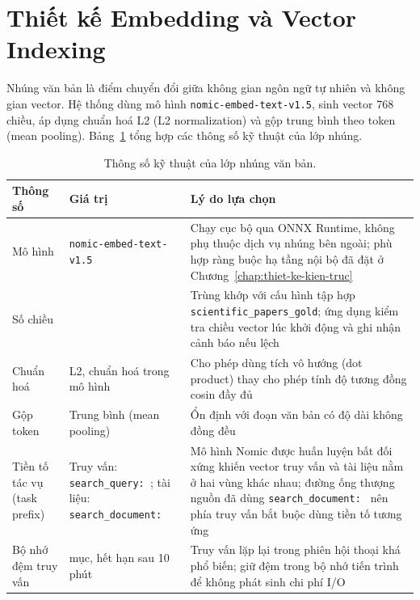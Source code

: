 \section{Thiết kế Embedding và Vector Indexing}
\label{sec:embedding-vector-indexing}

Nhúng văn bản là điểm chuyển đổi giữa không gian ngôn ngữ tự nhiên và không gian vector. Hệ thống dùng mô hình \texttt{nomic-embed-text-v1.5}, sinh vector 768 chiều, áp dụng chuẩn hoá L2 (L2 normalization) và gộp trung bình theo token (mean pooling). Bảng~\ref{tab:thong-so-embedding} tổng hợp các thông số kỹ thuật của lớp nhúng.

\begin{table}[htbp]
    \centering
    \caption{Thông số kỹ thuật của lớp nhúng văn bản.}
    \label{tab:thong-so-embedding}
    \small
    \begin{tabularx}{\textwidth}{@{}>{\raggedright\arraybackslash}p{3.2cm}>{\raggedright\arraybackslash}p{4.45cm}>{\raggedright\arraybackslash}X@{}}
        \toprule
        \textbf{Thông số} & \textbf{Giá trị} & \textbf{Lý do lựa chọn} \\
        \midrule
        Mô hình & \texttt{nomic-embed-text-v1.5} & Chạy cục bộ qua ONNX Runtime, không phụ thuộc dịch vụ nhúng bên ngoài; phù hợp ràng buộc hạ tầng nội bộ đã đặt ở Chương~\ref{chap:thiet-ke-kien-truc} \\
        Số chiều & 768 & Trùng khớp với cấu hình tập hợp \texttt{scientific\_papers\_gold}; ứng dụng kiểm tra chiều vector lúc khởi động và ghi nhận cảnh báo nếu lệch \\
        Chuẩn hoá & L2, chuẩn hoá trong mô hình & Cho phép dùng tích vô hướng (dot product) thay cho phép tính độ tương đồng cosin đầy đủ \\
        Gộp token & Trung bình (mean pooling) & Ổn định với đoạn văn bản có độ dài không đồng đều \\
        Tiền tố tác vụ (task prefix) & Truy vấn: \texttt{search\_query: }; tài liệu: \texttt{search\_document: } & Mô hình Nomic được huấn luyện bất đối xứng khiến vector truy vấn và tài liệu nằm ở hai vùng khác nhau; đường ống thượng nguồn đã dùng \texttt{search\_document: } nên phía truy vấn bắt buộc dùng tiền tố tương ứng \\
        Bộ nhớ đệm truy vấn & 500 mục, hết hạn sau 10 phút & Truy vấn lặp lại trong phiên hội thoại khá phổ biến; giữ đệm trong bộ nhớ tiến trình để không phát sinh chi phí I/O \\
        \bottomrule
    \end{tabularx}
\end{table}


